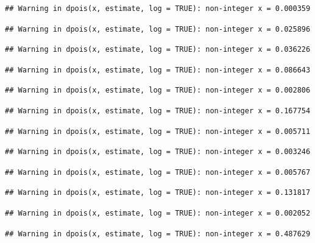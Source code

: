 \documentclass[]{article}
\begin{document}
\begin{verbatim}
## Warning in dpois(x, estimate, log = TRUE): non-integer x = 0.000359
\end{verbatim}

\begin{verbatim}
## Warning in dpois(x, estimate, log = TRUE): non-integer x = 0.025896
\end{verbatim}

\begin{verbatim}
## Warning in dpois(x, estimate, log = TRUE): non-integer x = 0.036226
\end{verbatim}

\begin{verbatim}
## Warning in dpois(x, estimate, log = TRUE): non-integer x = 0.086643
\end{verbatim}

\begin{verbatim}
## Warning in dpois(x, estimate, log = TRUE): non-integer x = 0.002806
\end{verbatim}

\begin{verbatim}
## Warning in dpois(x, estimate, log = TRUE): non-integer x = 0.167754
\end{verbatim}

\begin{verbatim}
## Warning in dpois(x, estimate, log = TRUE): non-integer x = 0.005711
\end{verbatim}

\begin{verbatim}
## Warning in dpois(x, estimate, log = TRUE): non-integer x = 0.003246
\end{verbatim}

\begin{verbatim}
## Warning in dpois(x, estimate, log = TRUE): non-integer x = 0.005767
\end{verbatim}

\begin{verbatim}
## Warning in dpois(x, estimate, log = TRUE): non-integer x = 0.131817
\end{verbatim}

\begin{verbatim}
## Warning in dpois(x, estimate, log = TRUE): non-integer x = 0.002052
\end{verbatim}

\begin{verbatim}
## Warning in dpois(x, estimate, log = TRUE): non-integer x = 0.487629
\end{verbatim}
\end{document}
